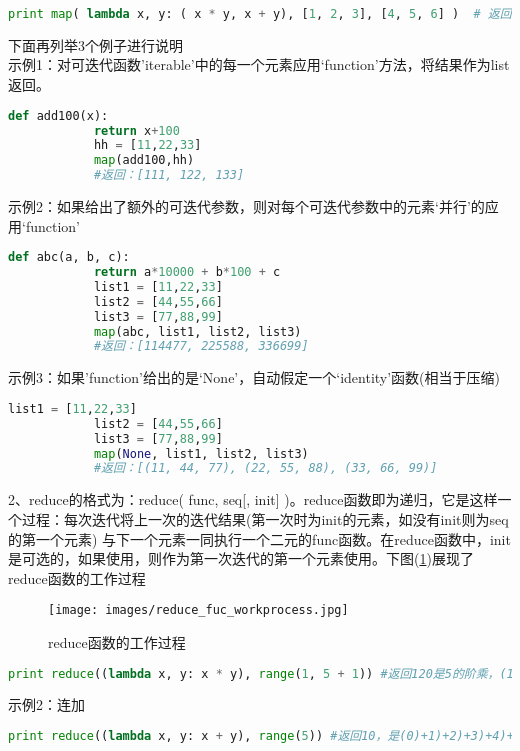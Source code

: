                 \begin{lstlisting}[language=Python]
            print map( lambda x, y: ( x * y, x + y), [1, 2, 3], [4, 5, 6] )  # 返回[(4, 5), (10, 7), (18, 9)]
                \end{lstlisting}
            \par
            下面再列举3个例子进行说明\\
            示例1：对可迭代函数'iterable'中的每一个元素应用‘function’方法，将结果作为list返回。
                \begin{lstlisting}[language=Python]
            def add100(x):
            return x+100
            hh = [11,22,33]
            map(add100,hh)
            #返回：[111, 122, 133]
                \end{lstlisting}
            示例2：如果给出了额外的可迭代参数，则对每个可迭代参数中的元素‘并行’的应用‘function’
                \begin{lstlisting}[language=Python]
            def abc(a, b, c):
            return a*10000 + b*100 + c
            list1 = [11,22,33]
            list2 = [44,55,66]
            list3 = [77,88,99]
            map(abc, list1, list2, list3)
            #返回：[114477, 225588, 336699]
                \end{lstlisting}
            示例3：如果'function'给出的是‘None’，自动假定一个‘identity’函数(相当于压缩)
                \begin{lstlisting}[language=Python]
            list1 = [11,22,33]
            list2 = [44,55,66]
            list3 = [77,88,99]
            map(None, list1, list2, list3)
            #返回：[(11, 44, 77), (22, 55, 88), (33, 66, 99)]
                \end{lstlisting}
            \par
            2、reduce的格式为：reduce( func, seq[, init] )。reduce函数即为递归，它是这样一个过程：每次迭代将上一次的迭代结果(第一次时为init的元素，如没有init则为seq的第一个元素) 与下一个元素一同执行一个二元的func函数。在reduce函数中，init是可选的，如果使用，则作为第一次迭代的第一个元素使用。下图(\ref{fig:reduce函数的工作过程})展现了reduce函数的工作过程
            \begin{figure}[H]
            \centering
            \texttt{[image: images/reduce\_fuc\_workprocess.jpg]}
            \caption{reduce函数的工作过程}
            \label{fig:reduce函数的工作过程}
            \end{figure}
                \begin{lstlisting}[language=Python]
            print reduce((lambda x, y: x * y), range(1, 5 + 1)) #返回120是5的阶乘，(1)*2)*3)*4)*5
                \end{lstlisting}
            示例2：连加
                \begin{lstlisting}[language=Python]
            print reduce((lambda x, y: x + y), range(5)) #返回10，是(0)+1)+2)+3)+4)+5
                \end{lstlisting}
